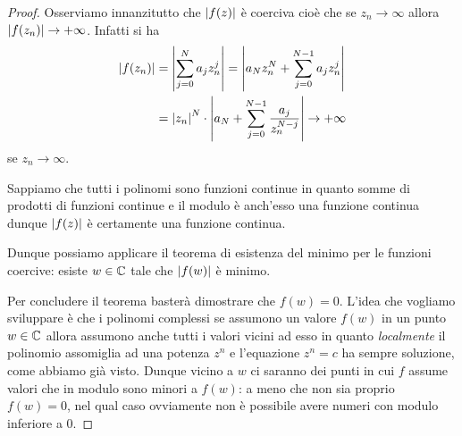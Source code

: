 \begin{proof}
  Osserviamo innanzitutto che ${\left|f(z)\right|}$ è coerciva cioè che
  se $z_n \to \infty$ allora ${\left|f(z_n)\right|}\to +\infty$.
  Infatti si ha
  \begin{align*}
    {\left|f(z_n)\right|}
    &= {\left|\sum_{j=0}^N a_j z_n^j\right|}
    = {\left|a_N z_n^N  + \sum_{j=0}^{N-1} a_j z_n^j\right|}\\
    &= {\left|z_n\right|}^N \cdot {\left|a_N + \sum_{j=0}^{N-1} \frac{a_j}{z_n^{N-j}}\right|}
    \to +\infty
  \end{align*}
  se $z_n \to \infty$.
  
  Sappiamo che tutti i polinomi sono funzioni continue in quanto somme di 
  prodotti di funzioni continue e il modulo è anch'esso una funzione continua 
  dunque ${\left|f(z)\right|}$ è certamente una funzione continua.
  
  Dunque possiamo applicare il teorema di esistenza del minimo per le funzioni 
  coercive: esiste $w\in {\mathbb C}$ tale che ${\left|f(w)\right|}$ è minimo.
  
  Per concludere il teorema basterà dimostrare che $f(w)=0$.
  L'idea che vogliamo sviluppare è che i polinomi complessi se assumono un valore
  $f(w)$ in un punto $w\in {\mathbb C}$ allora assumono anche tutti i valori vicini
  ad esso in quanto \emph{localmente} il polinomio assomiglia ad una potenza $z^n$
  e l'equazione $z^n=c$ ha sempre soluzione, come abbiamo già visto.
  Dunque vicino a $w$ ci saranno dei punti in cui $f$ assume valori che in modulo 
  sono minori a $f(w)$: a meno che non sia proprio $f(w)=0$, nel qual caso 
  ovviamente non è possibile avere numeri con modulo inferiore a $0$.
  

\end{proof}
